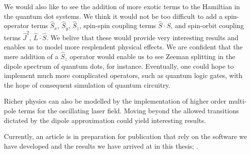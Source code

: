 We would also like to see the addition of more exotic terms to the Hamiltian in the 
quantum dot systems. We think it would not be too difficult to add a spin-operator 
terms $\hat{S}_x$, $\hat{S}_y$, $\hat{S}_z$, spin-spin coupling terms
$\hat{S}\cdot\hat{S}$, and spin-orbit
coupling terms $\hat{J}^2$, $\hat{L}\cdot\hat{S}$. We belive that these would provide 
very interesting results and enables us to model more resplendent physical effects. We are 
confident that the 
mere addition of a $\hat{S}_z$ operator would enable us to see Zeeman splitting in 
the dipole spectrum of quantum dots, for instance. Eventually, one could hope to 
implement much more complicated operators, such as quantum logic gates, with the 
hope of consequent simulation of quantum circuitry.

Richer physics can also be modelled by the implementation of higher order 
multi-pole terms for the oscillating laser field. Moving beyond the allowed transitions
dictated by the dipole approximation could yield interesting results.

Currently, an article is in preparation for publication that rely on the 
software we have developed and the results we have arrived at in this thesis;
\citeauthor{kristiansen2019time}\cite{kristiansen2019time}.
